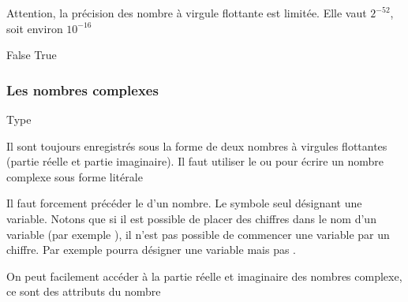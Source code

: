 \documentclass[letterpaper,10pt,english]{sphinxhowto}
\begin{document}
\sphinxAtStartPar
Attention, la précision des nombre à virgule flottante est limitée. Elle vaut \(2^{-52}\), soit environ \(10^{-16}\)

\begin{sphinxVerbatim}[commandchars=\\\{\}]
  
    
    
\end{sphinxVerbatim}

\begin{sphinxVerbatim}[commandchars=\\\{\}]
False
True
\end{sphinxVerbatim}


\subsubsection{Les nombres complexes}
\label{\detokenize{cours2_nombres_cours:les-nombres-complexes}}
\sphinxAtStartPar
Type 

\sphinxAtStartPar
Il sont toujours enregistrés sous la forme de deux nombres à virgules flottantes (partie réelle et partie imaginaire). Il faut utiliser le  ou  pour écrire un nombre complexe sous forme litérale

\begin{sphinxVerbatim}[commandchars=\\\{\}]
    
  
\end{sphinxVerbatim}

\sphinxAtStartPar
Il faut forcement précéder le  d’un nombre. Le symbole  seul désignant une variable. Notons que si il est possible de placer des chiffres dans le nom d’un variable (par exemple ), il n’est pas possible de commencer une variable par un chiffre. Par exemple  pourra désigner une variable mais pas .

\sphinxAtStartPar
On peut facilement accéder à la partie réelle et imaginaire des nombres complexe, ce sont des attributs du nombre
\end{document}
